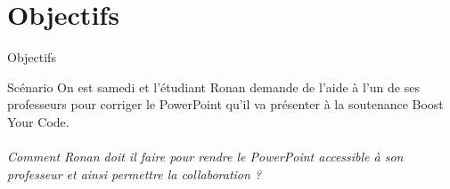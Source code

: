 \section{Objectifs}

\begin{frame}{Objectifs}
  \begin{block}{Scénario}
  On est samedi et l'étudiant Ronan demande de l'aide à l'un de ses professeurs
  pour corriger le PowerPoint qu'il va présenter à la soutenance Boost Your
  Code.\\
  ~\\
  \emph{Comment Ronan doit il faire pour rendre le PowerPoint accessible à son
  professeur et ainsi permettre la collaboration ?}
  \end{block}
\end{frame}


